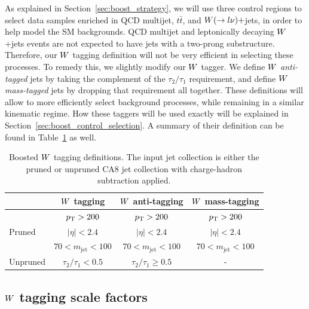 As explained in Section~\ref{sec:boost_strategy}, we will use three control regions to select data
samples enriched in QCD multijet, $t\bar{t}$, and $W(\rightarrow l \nu)+$jets, in order to help
model the SM backgrounds. QCD multijet and leptonically decaying $W$+jets events are not expected
to have jets with a two-prong substructure. Therefore, our $W$ tagging definition will not be very
efficient in selecting these processes. To remedy this, we slightly modify our $W$ tagger. 
We define $W$ \textit{anti-tagged} jets by taking the complement of the $\tau_2 / \tau_1$
requirement, and define $W$ \textit{mass-tagged} jets by dropping that requirement all together. 
These definitions will allow to more efficiently select background processes, while remaining in a
similar kinematic regime. How these taggers will be used exactly will be explained in
Section~\ref{sec:boost_control_selection}. A summary of their definition can be found in
Table~\ref{tab:Wtag_definition} as well. 

\begin{table}[htdp]
\caption{Boosted $W$ tagging definitions. The input jet collection is either the pruned or unpruned
CA8 jet collection with charge-hadron subtraction applied. }
\vspace{1ex}
\centering
\begin{tabular}{l c c c}
\toprule
& $W$ tagging & $W$ anti-tagging & $W$ mass-tagging  \\
\midrule
\multirow{3}{*}{Pruned} & $p_{\mathrm{T}} > 200$  & $p_{\mathrm{T}} > 200$  & $p_{\mathrm{T}} > 200$\\
& $|\eta| < 2.4$ & $|\eta| < 2.4$ & $|\eta| < 2.4$\\
& $70 < m_{\textrm{jet}}< 100$ & $70 < m_{\textrm{jet}}< 100$ & $70 < m_{\textrm{jet}}< 100$\\
\midrule
Unpruned & $\tau_2 / \tau_1 < 0.5$ & $\tau_2 / \tau_1 \geq 0.5$ & -\\
\bottomrule
\end{tabular}
\label{tab:Wtag_definition}
\end{table}


\subsection{\texorpdfstring{$W$}{W} tagging scale factors \label{sec:wtag_scale_factor}}

